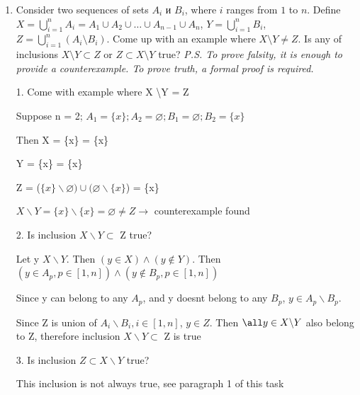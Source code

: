 \documentclass[12pt]{article}
\begin{document}
\begin{enumerate}
Reflexive, anti symmetric, transitive

3.  \(R_3=\{(a,a),(a,c),(c,b),(a,b)\}\)

Anti-symmetric, transitive


\item Consider two sequences of sets \(A_i\) и \(B_i\), where \(i\) ranges from \(1\) to \(n\). Define
\(X = \bigcup_{i=1}^n A_i = A_1 \cup A_2 \cup \ldots \cup A_{n-1} \cup A_n\), \(Y = \bigcup_{i=1}^n B_i\), \(Z = \bigcup_{i=1}^n (A_i \setminus B_i)\). Come up with an example where \(X \setminus Y \neq Z\). Is any of inclusions \(X \setminus Y \subset Z\) or \(Z \subset X \setminus Y\) true?
\textit{P.S. To prove falsity, it is enough to provide a counterexample. To prove truth, a formal proof is required.}

1. Come with example where X \backslash Y \not = Z

Suppose n = 2; $A_1 = \{x\}; A_2 = \varnothing; B_1 = \varnothing; B_2 = \{x\}$

Then X = \{x\} \cup \varnothing = \{x\}

Y = \varnothing \cup \{x\} = \{x\}

Z = ($\{x\} \backslash \varnothing) \cup (\varnothing \backslash \{x\}$) = \{x\}

$X \backslash Y = \{x\} \backslash \{x\} = \varnothing \not = Z \longrightarrow$ counterexample found


2. Is inclusion $X \backslash Y \subset$ Z true?

Let y \in $X \backslash Y$. Then $(y \in X) \land (y \not \in Y)$. Then $(y \in A_p, p \in [1,n]) \land (y \not \in B_p, p \in [1,n])$

Since y can belong to any $A_p$, and y doesnt belong to any $B_p$, $y \in A_p \backslash B_p$.

Since Z is union of $A_i \backslash B_i, i \in [1,n]$, $y \in Z$. Then $\all y \in X \backslash Y$ also belong to Z, therefore inclusion $X \backslash Y \subset$ Z is true

3. Is inclusion $Z \subset X \backslash Y$ true?

This inclusion is not always true, see paragraph 1 of this task


    
    


\end{enumerate}
\end{document}

